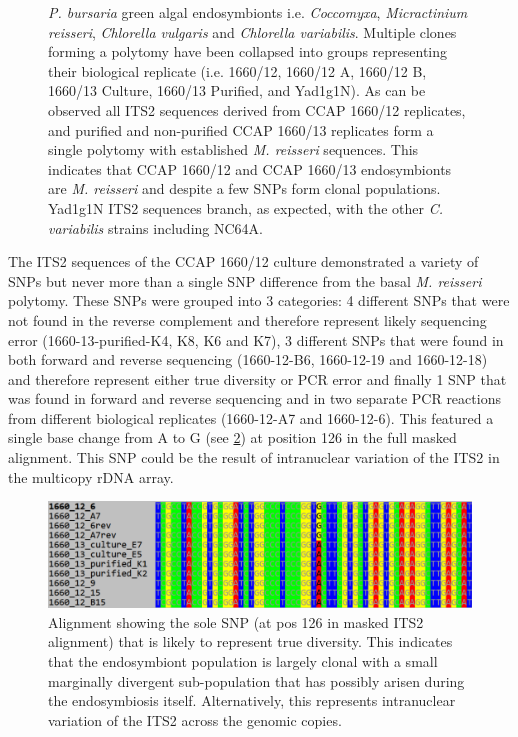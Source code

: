 \begin{figure}
{    \textit{P. bursaria} green algal endosymbionts i.e. \textit{Coccomyxa}, \textit{Micractinium reisseri},
    \textit{Chlorella vulgaris} and \textit{Chlorella variabilis}.  Multiple clones
    forming a polytomy have been collapsed into groups representing their biological
    replicate (i.e. 1660/12, 1660/12 A, 1660/12 B, 1660/13 Culture, 1660/13 Purified,
    and Yad1g1N). As can be observed all
    ITS2 sequences derived from CCAP 1660/12 replicates, and purified and non-purified CCAP 1660/13
    replicates form a single polytomy with established \textit{M. reisseri} sequences.  This indicates 
    that CCAP 1660/12 and CCAP 1660/13 endosymbionts are \textit{M. reisseri} and despite a few SNPs
form clonal populations.  Yad1g1N ITS2 sequences branch, as expected, with the other \textit{C. variabilis}
strains including NC64A.}
    \label{fig:its2_phylo}
\end{figure}

The ITS2 sequences of the CCAP 1660/12 culture demonstrated a 
variety of SNPs but never more than a single SNP difference from the basal \textit{M. reisseri}
polytomy.  These SNPs were grouped into 3 categories: 4 different SNPs that were not found in the
reverse complement and therefore represent likely sequencing error (1660-13-purified-K4, K8, K6 and K7),
3 different SNPs that were found in both forward and reverse sequencing (1660-12-B6, 1660-12-19 and 1660-12-18) and therefore
represent either true diversity or PCR error and finally 1 SNP that was found in 
forward and reverse sequencing and in two separate PCR reactions from different biological replicates (1660-12-A7 and 1660-12-6).
This featured a single base change from A to G (see \cref{fig:its2_snp}) at position 126 in the full masked alignment. 
This SNP could be the result of intranuclear variation of the ITS2 in the multicopy rDNA array.

\begin{figure}
    \includegraphics[width=\textwidth]{its_snp.pdf}
    \caption[ITS2 SNP alignment]{Alignment showing the sole SNP (at pos 126 in masked ITS2 alignment)
        that is likely to represent true diversity.  This indicates that the endosymbiont
    population is largely clonal with a small marginally divergent sub-population that has possibly
arisen during the endosymbiosis itself. Alternatively, this represents intranuclear variation of
the ITS2 across the genomic copies.}
    \label{fig:its2_snp}
\end{figure}

